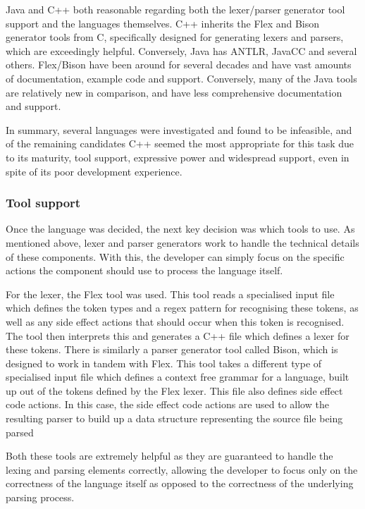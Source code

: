 \documentclass[11pt]{article}
\begin{document}
Java and C++ both reasonable regarding both the lexer/parser generator tool support and the languages themselves. C++ inherits the Flex and Bison generator tools from C, specifically designed for generating lexers and parsers, which are exceedingly helpful. Conversely, Java has ANTLR, JavaCC and several others. Flex/Bison have been around for several decades and have vast amounts of documentation, example code and support. Conversely, many of the Java tools are relatively new in comparison, and have less comprehensive documentation and support.

In summary, several languages were investigated and found to be infeasible, and of the remaining candidates C++ seemed the most appropriate for this task due to its maturity, tool support, expressive power and widespread support, even in spite of its poor development experience.

\subsubsection{Tool support}

Once the language was decided, the next key decision was which tools to use. As mentioned above, lexer and parser generators work to handle the technical details of these components. With this, the developer can simply focus on the specific actions the component should use to process the language itself.

For the lexer, the Flex tool was used. This tool reads a specialised input file which defines the token types and a regex pattern for recognising these tokens, as well as any side effect actions that should occur when this token is recognised. The tool then interprets this and generates a C++ file which defines a lexer for these tokens. There is similarly a parser generator tool called Bison, which is designed to work in tandem with Flex. This tool takes a different type of specialised input file which defines a context free grammar for a language, built up out of the tokens defined by the Flex lexer. This file also defines side effect code actions. In this case, the side effect code actions are used to allow the resulting parser to build up a data structure representing the source file being parsed

Both these tools are extremely helpful as they are guaranteed to handle the lexing and parsing elements correctly, allowing the developer to focus only on the correctness of the language itself as opposed to the correctness of the underlying parsing process.
\end{document}
